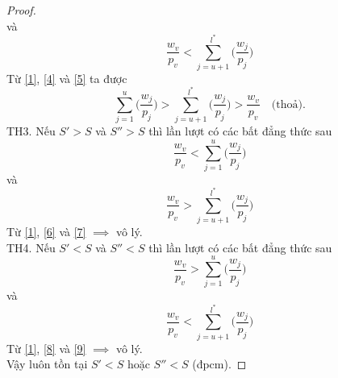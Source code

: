 \begin{proof}
\begin{equation}
	\end{equation}
	và
	\begin{equation} \label{5}
		\frac{w_v}{p_v} < \sum_{j=u+1}^{l^*}\biggl(\frac{w_j}{p_j}\biggr)
	\end{equation}
	Từ \eqref{1}, \eqref{4} và \eqref{5} ta được
	\begin{equation}
		 \sum_{j=1}^{u}\biggl(\frac{w_j}{p_j}\biggl) > \sum_{j=u+1}^{l^*}\biggl(\frac{w_j}{p_j}\biggl) > \frac{w_v}{p_v} \quad \text{(thoả).}
	\end{equation}
	TH3.
	Nếu $S' > S$ và $S'' > S$ thì lần lượt có các bất đẳng thức sau
	\begin{equation} \label{6}
		\frac{w_v}{p_v} < \sum_{j=1}^{u}\biggl(\frac{w_j}{p_j}\biggr)
	\end{equation}
	và
	\begin{equation} \label{7}
		\frac{w_v}{p_v} > \sum_{j=u+1}^{l^*}\biggl(\frac{w_j}{p_j}\biggr)
	\end{equation}
	Từ \eqref{1}, \eqref{6} và \eqref{7} $\implies$ vô lý. \\
	TH4.
	Nếu $S' < S$ và $S'' < S$ thì lần lượt có các bất đẳng thức sau
	\begin{equation} \label{8}
		\frac{w_v}{p_v} > \sum_{j=1}^{u}\biggl(\frac{w_j}{p_j}\biggr)
	\end{equation}
	và
	\begin{equation} \label{9}
		\frac{w_v}{p_v} < \sum_{j=u+1}^{l^*}\biggl(\frac{w_j}{p_j}\biggr)
	\end{equation}
	Từ \eqref{1}, \eqref{8} và \eqref{9} $\implies$ vô lý. \\
	Vậy luôn tồn tại $S'<S$ hoặc $S''<S$ (đpcm).
\end{proof}

